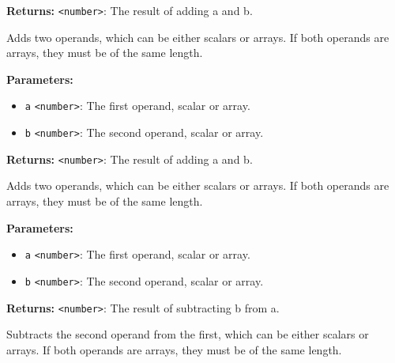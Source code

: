\documentclass[12pt,a4paper]{article}
\begin{document}
\noindent \textbf{Returns:} \texttt{<number>}: The result of adding \textasciigrave{}a\textasciigrave{} and \textasciigrave{}b\textasciigrave{}.

\noindent Adds two operands, which can be either scalars or arrays.
If both operands are arrays, they must be of the same length.

\vspace{5mm}
\noindent {}


\noindent \textbf{Parameters:}
\begin{itemize}
  \item \texttt{a} \texttt{<number>}: The first operand, scalar or array.
  \item \texttt{b} \texttt{<number>}: The second operand, scalar or array.
\end{itemize}

\noindent \textbf{Returns:} \texttt{<number>}: The result of adding \textasciigrave{}a\textasciigrave{} and \textasciigrave{}b\textasciigrave{}.

\noindent Adds two operands, which can be either scalars or arrays.
If both operands are arrays, they must be of the same length.

\vspace{5mm}
\noindent {}


\noindent \textbf{Parameters:}
\begin{itemize}
  \item \texttt{a} \texttt{<number>}: The first operand, scalar or array.
  \item \texttt{b} \texttt{<number>}: The second operand, scalar or array.
\end{itemize}

\noindent \textbf{Returns:} \texttt{<number>}: The result of subtracting \textasciigrave{}b\textasciigrave{} from \textasciigrave{}a\textasciigrave{}.

\noindent Subtracts the second operand from the first, which can be either scalars or arrays.
If both operands are arrays, they must be of the same length.

\vspace{5mm}
\noindent {}
\end{document}
